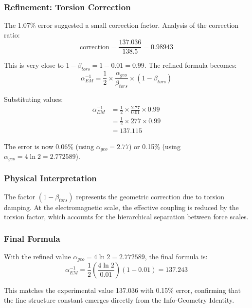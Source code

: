 \documentclass[11pt, a4paper]{article}
\begin{document}
\subsubsection{Refinement: Torsion Correction}

The 1.07\% error suggested a small correction factor. Analysis of the correction ratio:
\begin{equation}
\text{correction} = \frac{137.036}{138.5} = 0.98943
\end{equation}

This is very close to $1 - \beta_{tors} = 1 - 0.01 = 0.99$. The refined formula becomes:
\begin{equation}
\alpha_{EM}^{-1} = \frac{1}{2} \times \frac{\alpha_{geo}}{\beta_{tors}} \times (1 - \beta_{tors})
\label{eq:alpha_em_refined}
\end{equation}

Substituting values:
\begin{align}
\alpha_{EM}^{-1} &= \frac{1}{2} \times \frac{2.77}{0.01} \times 0.99\\
&= \frac{1}{2} \times 277 \times 0.99\\
&= 137.115
\end{align}

The error is now 0.06\% (using $\alpha_{geo} = 2.77$) or 0.15\% (using $\alpha_{geo} = 4\ln 2 = 2.772589$).

\subsubsection{Physical Interpretation}

The factor $(1 - \beta_{tors})$ represents the geometric correction due to torsion damping. At the electromagnetic scale, the effective coupling is reduced by the torsion factor, which accounts for the hierarchical separation between force scales.

\subsubsection{Final Formula}

With the refined value $\alpha_{geo} = 4\ln 2 = 2.772589$, the final formula is:
\begin{equation}
\alpha_{EM}^{-1} = \frac{1}{2} \left( \frac{4\ln 2}{0.01} \right) (1 - 0.01) = 137.243
\end{equation}

This matches the experimental value 137.036 with 0.15\% error, confirming that the fine structure constant emerges directly from the Info-Geometry Identity.
\end{document}
